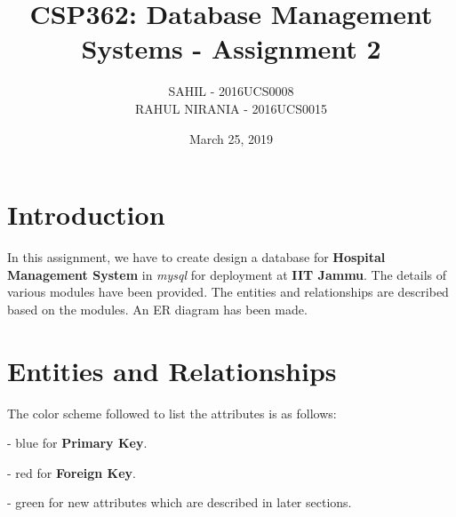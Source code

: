 \documentclass{article}
\title{CSP362: Database Management Systems - Assignment 2}
\author{SAHIL - 2016UCS0008 \\ RAHUL NIRANIA - 2016UCS0015}
\date{March 25, 2019}
\begin{document}
\maketitle

\section{Introduction}
\large
In this assignment, we have to create design a database for \textbf{Hospital Management System} in \textit{mysql} for deployment at \textbf{IIT Jammu}. The details of various modules have been provided. The entities and relationships are described based on the modules. An ER diagram has been made.

\section{Entities and Relationships}
The color scheme followed to list the attributes is as follows:

\item - {\color{blue}blue} for \textbf{Primary Key}.
\item - {\color{red}red} for \textbf{Foreign Key}.
\item - {\color{green}green} for new attributes which are described in later sections. 
\end{document}
